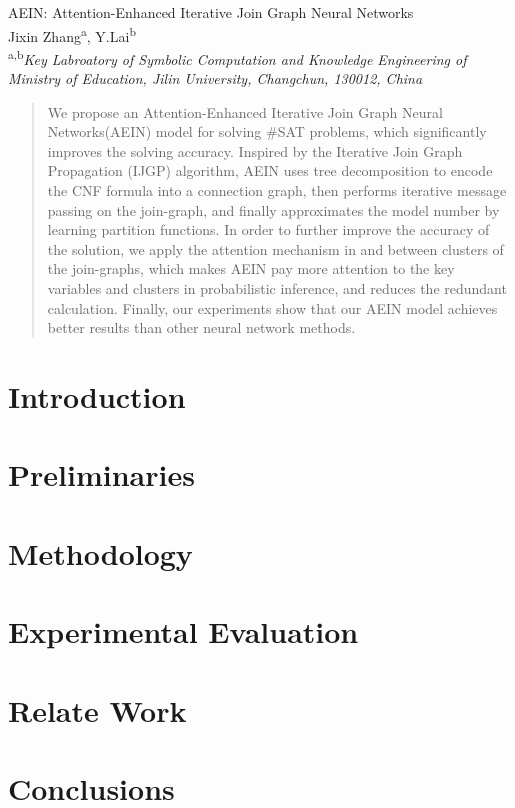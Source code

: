 \documentclass{article}
\begin{document}
\begin{center}
    {\LARGE {AEIN: Attention-Enhanced Iterative Join Graph Neural Networks}} \\[1.5em]
    Jixin Zhang\textsuperscript{a}, Y.Lai\textsuperscript{b} \\[0.5em]
    {\small \textsuperscript{a,b}\textit{Key Labroatory of Symbolic Computation and 
    Knowledge Engineering of Ministry of Education, Jilin University, Changchun, 130012, China}}
\end{center}
\begin{abstract}
We propose an Attention-Enhanced Iterative Join Graph Neural Networks(AEIN) model for solving 
\#SAT problems, which significantly improves the solving accuracy. Inspired by the Iterative 
Join Graph Propagation (IJGP) algorithm, AEIN uses tree decomposition to encode the CNF formula 
into a connection graph, then performs iterative message passing on the join-graph, and finally 
approximates the model number by learning partition functions. In order to further improve the 
accuracy of the solution, we apply the attention mechanism in and between clusters of the 
join-graphs, which makes AEIN pay more attention to the key variables and clusters in probabilistic 
inference, and reduces the redundant calculation. Finally, our experiments show that our AEIN model 
achieves better results than other neural network methods.
\end{abstract}

\section{Introduction}

\section{Preliminaries}

\section{Methodology}

\section{Experimental Evaluation}

\section{Relate Work}

\section{Conclusions}




\end{document}
